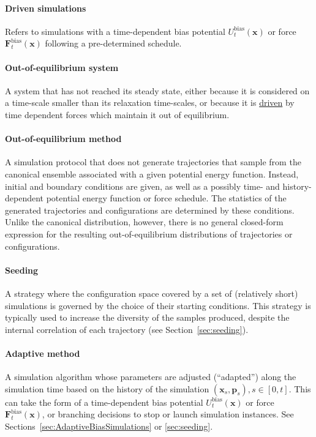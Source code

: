 \documentclass[9pt,review]{livecoms}
\newcommand{\vx}{\mathbf{x}}
\newcommand{\vp}{\mathbf{p}}
\newcommand{\vF}{\mathbf{F}}
\begin{document}
\hypertarget{ref:Driven} {\paragraph{Driven simulations}} Refers to simulations with a time-dependent bias potential $U^{\mathrm{bias}}_t(\vx)$ or force $\vF^\mathrm{bias}_t(\vx)$ following a pre-determined schedule.

\paragraph{Out-of-equilibrium system} A system that has not reached its steady state, either because it is considered on a time-scale smaller than its relaxation time-scales, or because it is \hyperlink{ref:Driven} {driven} by time dependent forces which maintain it out of equilibrium.

\hypertarget{ref:OutOfEq} {\paragraph{Out-of-equilibrium method}}
A simulation protocol that does not generate trajectories that sample from the canonical ensemble associated with a given potential energy function.
Instead, initial and boundary conditions are given, as well as a possibly time- and history-dependent potential energy function or force schedule. The statistics of the generated trajectories and configurations are determined by these conditions.
Unlike the canonical distribution, however, there is no general closed-form expression for the resulting out-of-equilibrium distributions of trajectories or configurations.

\hypertarget{ref:Seeding} {\paragraph{Seeding}}
A strategy where the configuration space covered by a set of (relatively short) simulations is governed by the choice of their starting conditions.
This strategy is typically used to increase the diversity of the samples produced, despite the internal correlation of each trajectory (see Section~\ref{sec:seeding}).


\hypertarget{ref:Adaptive} {\paragraph{Adaptive method}}
A simulation algorithm whose parameters are adjusted (``adapted'') along the simulation time based on the history of the simulation $(\vx_s, \vp_s), s\in [0, t]$.
This can take the form of a time-dependent bias potential $U^\mathrm{bias}_t(\vx)$ or force $\vF^\mathrm{bias}_t(\vx)$, or branching decisions to stop or launch simulation instances.
See Sections~\ref{sec:AdaptiveBiasSimulations} or \ref{sec:seeding}.
\end{document}
